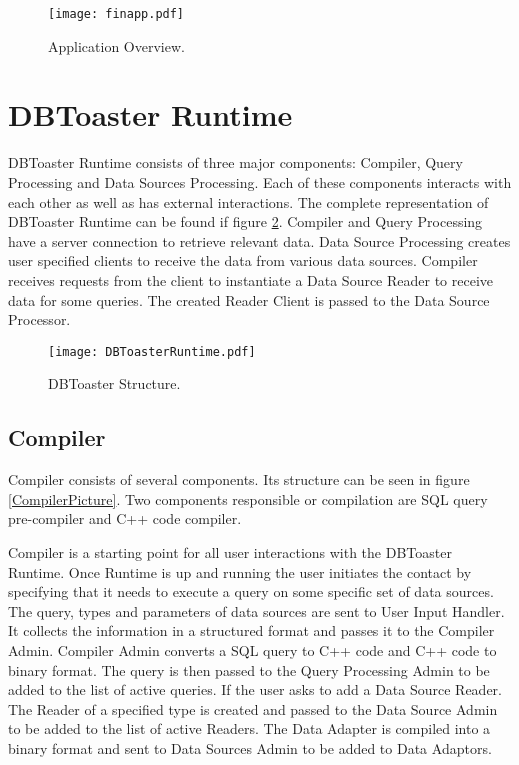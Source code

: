 \documentclass[11pt]{article}
\begin{document}
\begin{figure}
  \texttt{[image: finapp.pdf]}
  \caption{Application Overview.}
  \label{TheBigPicture}
\end{figure}



\section{DBToaster Runtime}

DBToaster Runtime consists of three major components: Compiler, Query Processing and Data Sources Processing. Each of these components interacts with each other as well as has external interactions. The complete representation of DBToaster Runtime can be found if figure \ref{DBToasterPic}. Compiler and Query Processing have a server connection to retrieve relevant data. Data Source Processing creates user specified clients to receive the data from various data sources. Compiler receives requests from the client to instantiate a Data Source Reader to receive data for some queries. The created Reader Client is passed to the Data Source Processor.

\begin{figure}
  \texttt{[image: DBToasterRuntime.pdf]}
  \caption{DBToaster Structure.}
  \label{DBToasterPic}
\end{figure}

\subsection{Compiler}

Compiler consists of several components. Its structure can be seen in figure \ref{CompilerPicture}. Two components responsible or compilation are SQL query pre-compiler and C++ code compiler. 

Compiler is a starting point for all user interactions with the DBToaster Runtime. Once Runtime is up and running the user initiates the contact by specifying that it needs to execute a query on some specific set of data sources. The query, types and parameters of data sources are sent to User Input Handler. It collects the information in a structured format and passes it to the Compiler Admin. Compiler Admin converts a SQL query to C++ code and C++ code to binary format. The query is then passed to the Query Processing Admin to be added to the list of active queries. If the user asks to add a Data Source Reader. The Reader of a specified type is created and passed to the Data Source Admin to be added to the list of active Readers. The Data Adapter is compiled into a binary format and sent to Data Sources Admin to be added to Data Adaptors. 
\end{document}
